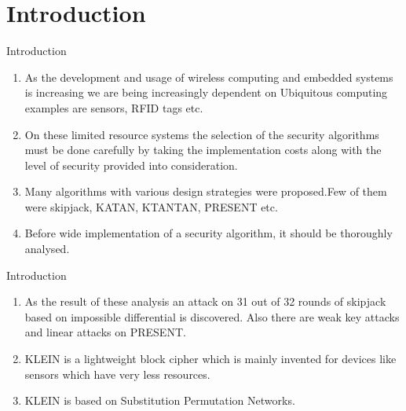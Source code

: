 \section{Introduction}

\begin{frame}{Introduction}
\begin{enumerate}
    \item As the development and usage of wireless computing and embedded systems is increasing we are being increasingly dependent on Ubiquitous computing examples are sensors, RFID tags etc.
    \item On these limited resource systems the selection of the security algorithms must be done carefully by taking the implementation costs along with the level of security provided into consideration.
    \item Many algorithms with various design strategies were proposed.Few of them were skipjack, KATAN, KTANTAN, PRESENT etc.
    \item Before wide implementation of a security algorithm, it should be thoroughly analysed.
    \seti
\end{enumerate}
\end{frame}

\begin{frame}{Introduction}
\begin{enumerate}
    \conti
    \item As the result of these analysis an attack on 31 out of 32 rounds of skipjack based on impossible differential is discovered. Also there are weak key attacks and linear attacks on PRESENT.
    \item  KLEIN is a lightweight block cipher which is mainly invented for devices like sensors which have very less resources.
    \item KLEIN is based on Substitution Permutation Networks.
    \seti
\end{enumerate}
\end{frame}